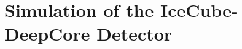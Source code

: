 \chapter{Simulation of the IceCube-DeepCore Detector}
\label{section:generators}


\label{section:propagation}


\label{section:electrionics}


\label{section:eventbuilding}

